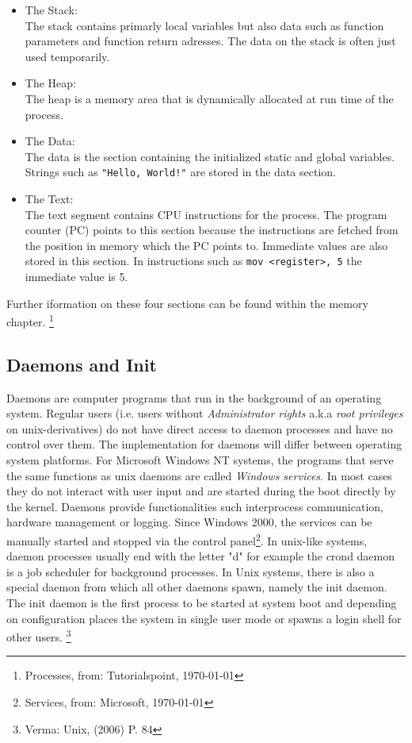 \begin{itemize}
\item The Stack: \\

The stack contains primarly local variables but also data such as function parameters and function return adresses. The data on the stack is often just used temporarily.
\item The Heap: \\

The heap is a memory area that is dynamically allocated at run time of the process.
\item The Data: \\

	The data is the section containing the initialized static and global variables. Strings such as \texttt{"Hello, World!"} are stored
	in the data section.
\item The Text: \\

	The text segment contains CPU instructions for the process. The program counter (PC) points to this section because the instructions are
		fetched from the position in memory which the PC points to. Immediate values are also stored in this section.
		In instructions such as \texttt{mov \textless register\textgreater, 5} the immediate value is 5.
\end{itemize}

Further iformation on these four sections can be found within the memory chapter. \footnote{Processes, from: Tutorialspoint, \today }


\subsection{Daemons and Init}

Daemons are computer programs that run in the background of an operating system. Regular users (i.e. users without \textit{Administrator rights} a.k.a \textit{root privileges} on unix-derivatives)
do not have direct access to daemon processes and have no control over them. The implementation for daemons will differ between
operating system platforms. For Microsoft Windows NT systems, the programs that serve the same functions as 
unix daemons are called \textit{Windows services}. In most cases they do not interact with user input and are started 
during the boot directly by the kernel.
Daemons provide functionalities such interprocess communication, hardware management or logging. 
Since Windows 2000, the services can be manually started and stopped via the control panel\footnote{Services, from: Microsoft, \today }.
In unix-like systems, daemon processes usually end with the letter "d" for example the crond daemon is 
a job scheduler for background processes. In Unix systems, there is also a special daemon from which all
other daemons spawn, namely the init daemon. The init daemon is the first process to be started at system boot 
and depending on configuration places the system in single user mode or spawns a login shell for other users. \footnote{Verma: Unix, (2006) P. 84 }








